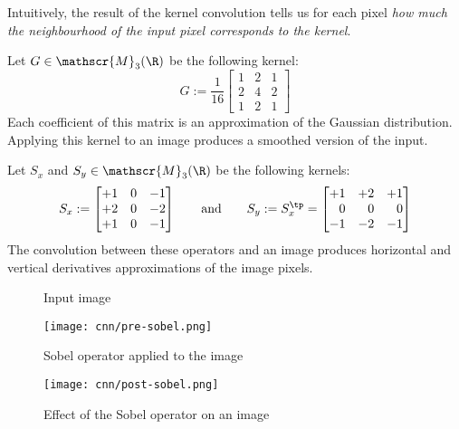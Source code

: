 Intuitively, the result of the kernel convolution tells us for each pixel \emph{how much the neighbourhood of the input pixel corresponds to the kernel}.

\begin{example}
    Let $G\in\mathscr{M}_{3}(\R)$ be the following kernel:
    \begin{equation*}
        G := \frac{1}{16}\begin{bmatrix}
            1 & 2 & 1\\
            2 & 4 & 2\\
            1 & 2 & 1
        \end{bmatrix}
    \end{equation*}
    Each coefficient of this matrix is an approximation of the Gaussian distribution. Applying this kernel to an image produces a smoothed version of the input.
\end{example}

\begin{example}
    Let $S_x$ and $S_y\in\mathscr{M}_{3}(\R)$ be the following kernels:
    \begin{equation*}
        S_x := \begin{bmatrix}
            +1 & 0 & -1\\
            +2 & 0 & -2\\
            +1 & 0 & -1
        \end{bmatrix}
        \qquad\textnormal{and}\qquad
        S_y := S_x^\tp = \begin{bmatrix}
            +1 & +2 & +1\\
            \phantom{+}0 & \phantom{+}0 & \phantom{+}0\\
            -1 & -2 & -1
        \end{bmatrix}
    \end{equation*}
    The convolution between these operators and an image produces horizontal and vertical derivatives approximations of the image pixels.

    \begin{figure}[H]
        \centering
    
        \begin{minipage}{0.4\textwidth}
            \centering
            \caption*{Input image}
            \texttt{[image: cnn/pre-sobel.png]}
        \end{minipage}
        \begin{minipage}{0.4\textwidth}
            \centering
            \caption*{Sobel operator applied to the image}
            \texttt{[image: cnn/post-sobel.png]}
        \end{minipage}
        
        \caption{Effect of the Sobel operator on an image}
    \end{figure}
\end{example}

